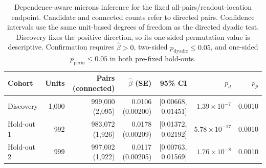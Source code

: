 \begin{table}[!htbp]
\centering
\caption{Dependence-aware \ac{microns} inference for the fixed all-pairs/readout-location endpoint. Candidate and connected counts refer to directed pairs. Confidence intervals use the same unit-based degrees of freedom as the directed dyadic test. Discovery fixes the positive direction, so its one-sided permutation value is descriptive. Confirmation requires $\widehat{\beta}>0$, two-sided $p_{\mathrm{dyadic}}\leq0.05$, and one-sided $p_{\mathrm{perm}}\leq0.05$ in both pre-fixed hold-outs.}
\label{tab:microns-dyadic-results}
\scriptsize
\renewcommand{\arraystretch}{1.05}
\setlength{\tabcolsep}{5pt}
\begin{tabularx}{\textwidth}{@{}Y r r r r r r@{}}
\toprule
Cohort & Units & Pairs (connected) & $\widehat{\beta}$ (SE) & 95\% CI & $p_d$ & $p_p$ \\
\midrule
Discovery & 1,000 & 999,000 (2,095) & 0.0106 (0.00200) & [0.00668, 0.01451] & $1.39\times10^{-7}$ & 0.0010 \\
Hold-out 1 & 992 & 983,072 (1,926) & 0.0178 (0.00209) & [0.01372, 0.02192] & $5.78\times10^{-17}$ & 0.0010 \\
Hold-out 2 & 999 & 997,002 (1,922) & 0.0117 (0.00205) & [0.00763, 0.01569] & $1.76\times10^{-8}$ & 0.0010 \\
\bottomrule
\end{tabularx}
\end{table}
